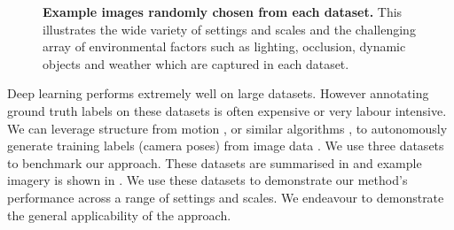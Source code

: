 \begin{figure}[p]
\caption[Localisation datasets.]{\textbf{Example images randomly chosen from each dataset.} This illustrates the wide variety of settings and scales and the challenging array of environmental factors such as lighting, occlusion, dynamic objects and weather which are captured in each dataset.}
\label{fig:datasets}
\end{figure}



Deep learning performs extremely well on large datasets. However annotating ground truth labels on these datasets is often expensive or very labour intensive. We can leverage structure from motion \citep{Snavely08IJCV}, or similar algorithms \citep{shotton2013scene}, to autonomously generate training labels (camera poses) from image data \citep{kendall2015posenet}. We use three datasets to benchmark our approach. These datasets are summarised in  and example imagery is shown in . We use these datasets to demonstrate our method's performance across a range of settings and scales. We endeavour to demonstrate the general applicability of the approach.

